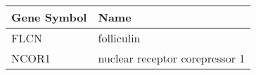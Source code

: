 \begin{tabular}{ll}
\toprule
Gene Symbol &                           Name \\
\midrule
       FLCN &                     folliculin \\
      NCOR1 & nuclear receptor corepressor 1 \\
\bottomrule
\end{tabular}
